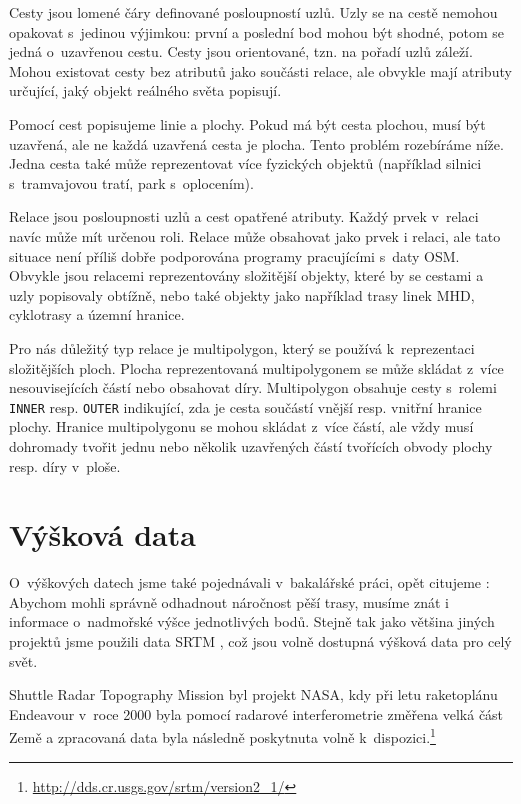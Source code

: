 {\tuc Cesty} jsou lomené čáry definované posloupností uzlů. Uzly se na cestě nemohou opakovat
s~jedinou výjimkou: první a poslední bod mohou být shodné, potom se jedná
o~uzavřenou cestu. Cesty jsou orientované, tzn. na pořadí uzlů záleží. Mohou
existovat cesty bez atributů jako součásti relace, ale obvykle mají atributy
určující, jaký objekt reálného světa popisují.

Pomocí cest popisujeme linie a plochy. Pokud má být cesta plochou, musí být
uzavřená, ale ne každá uzavřená cesta je plocha. Tento problém rozebíráme níže.
Jedna cesta také může reprezentovat více fyzických objektů (například silnici
s~tramvajovou tratí, park s~oplocením).

{\tuc Relace} jsou posloupnosti uzlů a cest opatřené atributy. Každý prvek
v~relaci navíc může mít určenou roli. Relace může obsahovat jako prvek i relaci,
ale tato situace není příliš dobře podporována programy pracujícími s~daty OSM. 
Obvykle jsou relacemi reprezentovány složitější objekty, které by se cestami a
uzly popisovaly obtížně, nebo také  objekty jako například
trasy linek MHD, cyklotrasy a územní hranice.

Pro nás důležitý typ relace je {\tuc multipolygon}, který se používá k~reprezentaci
složitějších ploch. Plocha reprezentovaná multipolygonem se může skládat z~více
nesouvisejících částí nebo obsahovat díry. Multipolygon obsahuje cesty s~rolemi 
\verb|INNER| resp. \verb|OUTER| indikující, zda je cesta součástí vnější resp.
vnitřní hranice plochy. Hranice multipolygonu se mohou skládat z~více částí, ale
vždy musí dohromady tvořit jednu nebo několik uzavřených částí tvořících obvody 
plochy resp. díry v~ploše.

\section{Výšková data}
O~výškových datech jsme také pojednávali v~bakalářské práci, opět
citujeme \cite{bakalarka}:
Abychom mohli správně odhadnout náročnost pěší trasy, musíme znát i informace
o~nadmořské výšce jednotlivých bodů. Stejně tak jako většina jiných projektů jsme
použili data SRTM \cite{SRTM}, což jsou volně dostupná výšková data pro celý
svět.

Shuttle Radar Topography Mission byl projekt NASA, kdy při letu raketoplánu
Endeavour v~roce 2000 byla pomocí radarové interferometrie změřena velká část
Země a zpracovaná data byla následně poskytnuta volně k~dispozici.\footnote{\url{http://dds.cr.usgs.gov/srtm/version2_1/}} 

